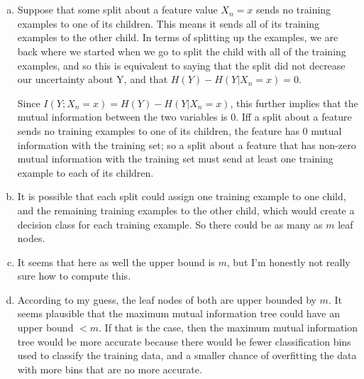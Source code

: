 \documentclass{article}
\begin{document}
\section{}
\begin{enumerate}[(a)]
\item
Suppose that some split about a feature value $X_n=x$ sends
no training examples to one of its children. This means it sends all of its
training examples to the other child. In terms of splitting up the examples, we
are back where we started when we go to split the child with all of the training
examples, and so this is equivalent to saying that the
split did not decrease our uncertainty about Y, and that 
$H(Y) - H(Y|X_n=x) = 0$.

\vspace{1em}

Since $I(Y;X_n=x) = H(Y) - H(Y|X_n=x)$, this further implies that the mutual
information between the two variables is 0. Iff a split about a feature
sends no training examples to one of its children, the feature has 0 mutual
information with the training set; so a split about a feature that has non-zero
mutual information with the training set must send at least one training
example to each of its children.

\item
It is possible that each split could assign one training example to one child,
and the remaining training examples to the other child, which would create a
decision class for each training example. So there could be as many as $m$ leaf
nodes.

\item
It seems that here as well the upper bound is $m$, but I'm honestly
not really sure how to compute this.

\item
According to my guess, the leaf nodes of both are upper bounded by $m$. It seems
plausible that the maximum mutual information tree could have an upper bound
$< m$. If that is the case, then the maximum mutual information tree would
be more accurate because there would be fewer classification bins used to
classify the training data, and a smaller chance of overfitting the data with
more bins that are no more accurate.

\end{enumerate}
\end{document}
